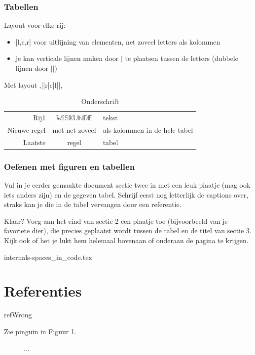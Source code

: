 \documentclass{cursuspresentatie}
\def\importslide#1#2{%
	{#2}
}
\begin{document}
\begin{frame}
	\frametitle{Tabellen}
	Layout voor elke rij:
	\begin{itemize}
		\item \hll|l,c,r| voor uitlijning van elementen, net zoveel letters als kolommen
		\item je kan verticale lijnen maken door $|$ te plaatsen tussen de letters (dubbele lijnen door $||$)
	\end{itemize}
	\begin{block}{Met layout \hll,||r|c|l||,}
		{\begin{table}
				\centering
				\begin{tabular}{||r|c|l||}
					Rij1 & $\mathbb{WISKUNDE}$ & tekst\\
					Nieuwe regel & met net zoveel & als kolommen in de hele tabel\\
					\hline
					Laatste & regel & tabel
				\end{tabular}
				\caption{Onderschrift}
				\label{tab: tabel}
		\end{table}}
	\end{block}
\end{frame}

\begin{frame}
	\frametitle{Oefenen met figuren en tabellen}
	Vul in je eerder gemaakte document sectie twee in met een leuk plaatje (mag
	ook iets anders zijn) en de gegeven tabel. Schrijf eerst nog letterlijk de
	captions over, straks kan je die in de tabel vervangen door een referentie.

	Klaar?	Voeg aan het eind van sectie 2 een plaatje toe (bijvoorbeeld van je
	favoriete dier), die precies geplaatst wordt tussen de tabel en de titel van
	sectie 3. Kijk ook of het je lukt hem helemaal bovenaan of onderaan de
	pagina te krijgen.
\end{frame}

\importslide{internals}{internals-spaces_in_code.tex}
	
\section{Referenties}

\begin{saveblock}{refWrong}
	\begin{highlightblock}[gobble=8,linewidth=\textwidth,
		framexleftmargin=0.25em,xleftmargin=0.25em]
		Zie pinguin in Figuur 1.
		\begin{figure} %
			... %
		\end{figure}
	\end{highlightblock}
\end{saveblock}
\end{document}
